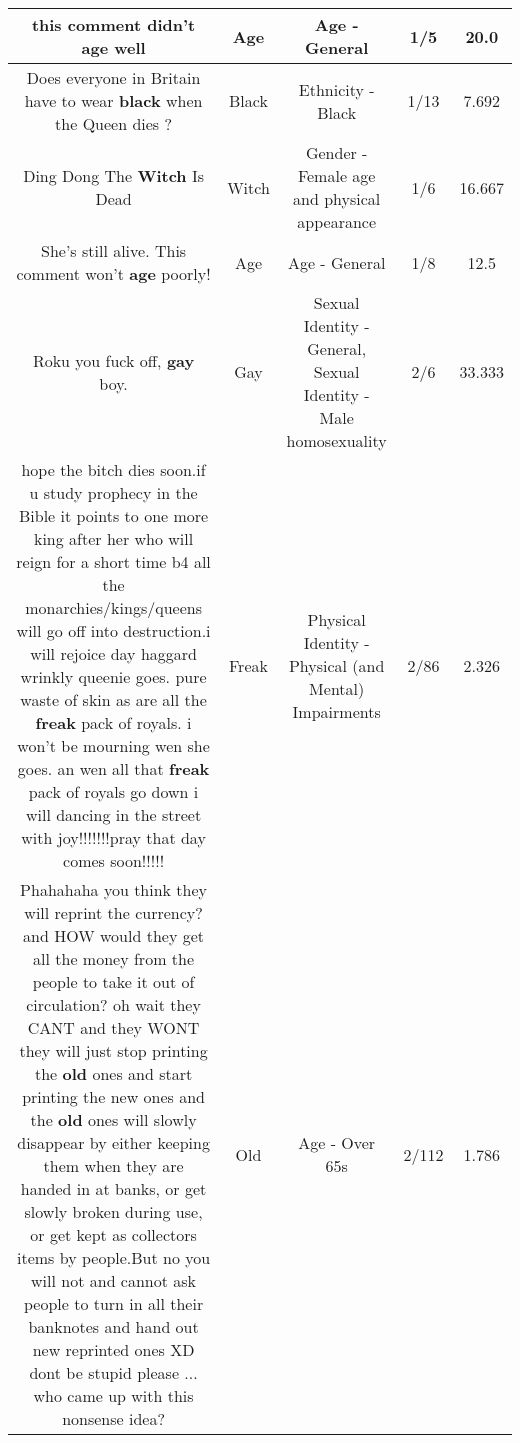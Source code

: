 \documentclass[11pt]{article}
\newlength\mylength
\begin{document}
\begin{center}
\begin{longtable}{|C{.65\mylength}|C{.30\mylength}|C{.12\mylength}|C{.12\mylength}|C{.12\mylength}|}
  \small this comment didn't \textbf{age} well\normalsize   & Age & Age - General & 1/5 & 20.0 \\  \hline
  \small Does everyone in Britain have to wear \textbf{black} when the Queen dies ?\normalsize   & Black & Ethnicity - Black & 1/13 & 7.692 \\  \hline
  \small Ding Dong The \textbf{Witch} Is Dead\normalsize   & Witch & Gender - Female age and physical appearance & 1/6 & 16.667 \\  \hline
  \small She's still alive. This comment won't \textbf{age} poorly!\normalsize   & Age & Age - General & 1/8 & 12.5 \\  \hline
  \small Roku you fuck off, \textbf{g\textbf{ay}} boy.\normalsize   & Gay & Sexual Identity - General, Sexual Identity - Male homosexuality & 2/6 & 33.333 \\  \hline
  \small hope the bitch dies soon.if u study prophecy in the Bible it points to one more king after her who will reign for a short time b4 all the monarchies/kings/queens will go off into destruction.i will rejoice day haggard  wrinkly queenie goes. pure waste of skin as are all the \textbf{freak} pack of royals. i won't be mourning wen she goes. an wen all that \textbf{freak} pack of royals go down i will dancing in the street with joy!!!!!!!pray that day comes soon!!!!!\normalsize   & Freak & Physical Identity - Physical (and Mental) Impairments & 2/86 & 2.326 \\  \hline
  \small Phahahaha you think they will reprint the currency? and HOW would they get all the money from the people to take it out of circulation? oh wait they CANT and they WONT they will just stop printing the \textbf{old} ones and start printing the new ones and the \textbf{old} ones will slowly disappear by either keeping them when they are handed in at banks, or get slowly broken during use, or get kept as collectors items by people.But no you will not and cannot ask people to turn in all their banknotes and hand out new reprinted ones XD dont be stupid please ... who came up with this nonsense idea?\normalsize   & Old & Age - Over 65s & 2/112 & 1.786 \\  \hline

\end{longtable}
\end{center}
\end{document}
